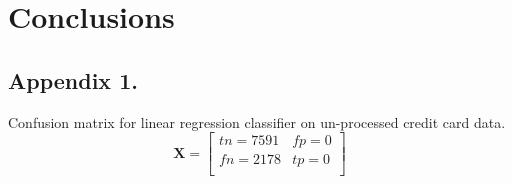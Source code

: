 \documentclass[%
oneside,                 %
final,                   %
10pt]{article}
\begin{document}
\section{Conclusions} \label{Section_Conclusions}






\begin{appendices}
\section*{Appendix 1.} \label{APP_1}
\end{appendices}
Confusion matrix for linear regression classifier on un-processed credit card data.
\begin{equation}
\bm{X}=\begin{bmatrix}
tn=7591 & fp=0 \\
fn=2178  &tp= 0 \\
\end{bmatrix}
\end{equation}
\end{document}
